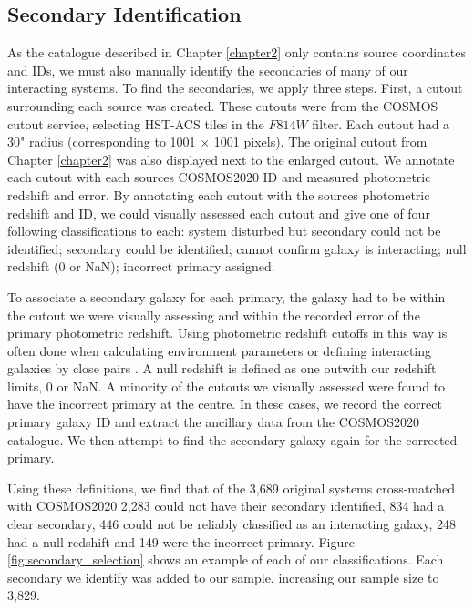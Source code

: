 \subsection{Secondary Identification}\label{sec:sec-ident}
\noindent As the catalogue described in Chapter \ref{chapter2} only contains source coordinates and IDs, we must also manually identify the secondaries of many of our interacting systems. To find the secondaries, we apply three steps. First, a cutout surrounding each source was created. These cutouts were from the COSMOS cutout service, selecting HST-ACS tiles in the $F814W$ filter. Each cutout had a 30" radius (corresponding to 1001 $\times$ 1001 pixels). The original cutout from Chapter \ref{chapter2} was also displayed next to the enlarged cutout. We annotate each cutout with each sources COSMOS2020 ID and measured photometric redshift and error. By annotating each cutout with the sources photometric redshift and ID, we could visually assessed each cutout and give one of four following classifications to each: system disturbed but secondary could not be identified; secondary could be identified; cannot confirm galaxy is interacting; null redshift (0 or NaN); incorrect primary assigned. 

To associate a secondary galaxy for each primary, the galaxy had to be within the cutout we were visually assessing and within the recorded error of the primary photometric redshift. Using photometric redshift cutoffs in this way is often done when calculating environment parameters \citep[e.g][]{2006MNRAS.373..469B} or defining interacting galaxies by close pairs \citep[e.g][]{2022ApJ...940....4S}. A null redshift is defined as one outwith our redshift limits, 0 or NaN. A minority of the cutouts we visually assessed were found to have the incorrect primary at the centre. In these cases, we record the correct primary galaxy ID and extract the ancillary data from the COSMOS2020 catalogue. We then attempt to find the secondary galaxy again for the corrected primary.

Using these definitions, we find that of the 3,689 original systems cross-matched with COSMOS2020 2,283 could not have their secondary identified, 834 had a clear secondary, 446 could not be reliably classified as an interacting galaxy, 248 had a null redshift and 149 were the incorrect primary. Figure \ref{fig:secondary_selection} shows an example of each of our classifications. Each secondary we identify was added to our sample, increasing our sample size to 3,829.

